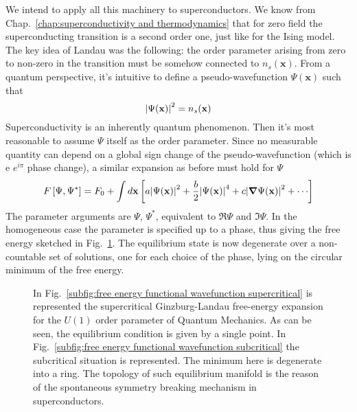 We intend to apply all this machinery to superconductors. We know from Chap.~\ref{chap:superconductivity and thermodynamics} that for zero field the superconducting transition is a second order one, just like for the Ising model. The key idea of Landau was the following: the order parameter arising from zero to non-zero in the transition must be somehow connected to $n_s(\mathbf{x})$. From a quantum perspective, it's intuitive to define a pseudo-wavefunction $\Psi(\mathbf{x})$ such that
\[
    \abs{\Psi(\mathbf{x})}^2 = n_s (\mathbf{x})
\]
Superconductivity is an inherently quantum phenomenon. Then it's most reasonable to assume $\Psi$ itself as the order parameter. Since no measurable quantity can depend on a global sign change of the pseudo-wavefunction (which is e $e^{i\pi}$ phase change), a similar expansion as before must hold for $\Psi$
\[ 
    F\left[{\Psi,\Psi^*}\right] = F_0 + \int d\mathbf{x} \left[{
        a \abs{\Psi(\mathbf{x}) }^2 + \frac{b}{2} \abs{ \Psi(\mathbf{x}) }^4 + c \abs{\grad \Psi(\mathbf{x}) }^2 + \cdots
    }\right]
\]
The parameter arguments are $\Psi$, $\Psi^*$, equivalent to $\Re{\Psi}$ and $\Im{\Psi}$. In the homogeneous case the parameter is specified up to a phase, thus giving the free energy sketched in Fig.~\ref{fig:free energy functional wavefunction}. The equilibrium state is now degenerate over a non-countable set of solutions, one for each choice of the phase, lying on the circular minimum of the free energy.

\begin{figure}
    \centering
    \caption{In Fig.~\ref{subfig:free energy functional wavefunction supercritical} is represented the supercritical Ginzburg-Landau free-energy expansion for the $U(1)$ order parameter of Quantum Mechanics. As can be seen, the equilibrium condition is given by a single point. In Fig.~\ref{subfig:free energy functional wavefunction subcritical} the subcritical situation is represented. The minimum here is degenerate into a ring. The topology of such equilibrium manifold is the reason of the spontaneous symmetry breaking mechanism in superconductors.}
    \label{fig:free energy functional wavefunction}
\end{figure}

